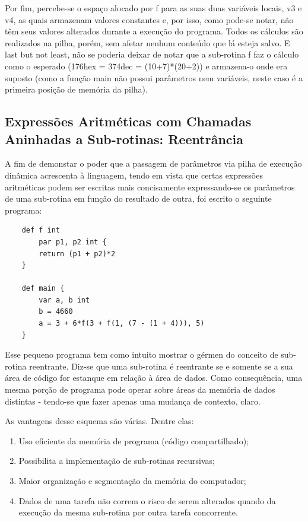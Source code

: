 \documentclass[a4paper,12pt]{report}
\begin{document}
    Por fim, percebe-se o espaço alocado por f para as suas duas variáveis locais, v3 e v4, as quais armazenam valores constantes e, por isso, como pode-se notar, não têm seus valores alterados durante a execução do programa. Todos os cálculos  são realizados na pilha, porém, sem afetar nenhum conteúdo que lá esteja salvo.
    E last but not least, não se poderia deixar de notar que a sub-rotina f faz o cálculo como o esperado (176hex = 374dec = (10+7)*(20+2)) e armazena-o onde era suposto (como a função main não possui parâmetros nem variáveis, neste caso é a primeira posição de memória da pilha). 

    \subsection*{Expressões Aritméticas com Chamadas Aninhadas a Sub-rotinas: Reentrância}
    A fim de demonstar o poder que a passagem de parâmetros via pilha de execução dinâmica acrescenta à linguagem, tendo em vista que certas expressões aritméticas podem ser escritas mais concisamente expressando-se os parâmetros de uma sub-rotina em função do resultado de outra, foi escrito o seguinte programa:

    \begin{lstlisting}
    def f int
        par p1, p2 int {
        return (p1 + p2)*2
    }

    def main {
        var a, b int
        b = 4660
        a = 3 + 6*f(3 + f(1, (7 - (1 + 4))), 5)
    }
    \end{lstlisting}

    Esse pequeno programa tem como intuito mostrar o gérmen do conceito de sub-rotina reentrante. Diz-se que uma sub-rotina é reentrante se e somente se a sua área de código for estanque em relação à área de dados. Como consequência, uma mesma porção de programa pode operar sobre áreas da memória de dados distintas - tendo-se que fazer apenas  uma mudança de contexto, claro.

    As vantagens desse esquema são várias. Dentre elas:

    \begin{enumerate}
        \item Uso eficiente da memória de programa (código compartilhado);
        \item Possibilita a implementação de sub-rotinas recursivas;
        \item Maior organização e segmentação da memória do computador;
        \item Dados de uma tarefa não correm o risco de serem alterados quando da execução da mesma sub-rotina por outra tarefa concorrente.
    \end{enumerate}
\end{document}

